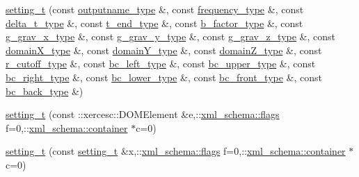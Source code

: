 \begin{DoxyCompactItemize}
\hyperlink{classsetting__t_a4e2de5576a4498b93491507ad7fbdcab}{setting\+\_\+t} (const \hyperlink{classsetting__t_a176d76dc9ab1b149c679035ce0aa5448}{outputname\+\_\+type} \&, const \hyperlink{classsetting__t_af0353930c8d9e0e19ee57943f2d130ee}{frequency\+\_\+type} \&, const \hyperlink{classsetting__t_ad2336c5ecdc0977272ba8126243d7977}{delta\+\_\+t\+\_\+type} \&, const \hyperlink{classsetting__t_ab27962fdbca01941c3b6c632bc7ac360}{t\+\_\+end\+\_\+type} \&, const \hyperlink{classsetting__t_afd5541e25ce3565005acb9c70bddda2d}{b\+\_\+factor\+\_\+type} \&, const \hyperlink{classsetting__t_af2a0b22be63f361de8ba6df7313b1a68}{g\+\_\+grav\+\_\+x\+\_\+type} \&, const \hyperlink{classsetting__t_a89b3c653de2dc5afa902042e34939589}{g\+\_\+grav\+\_\+y\+\_\+type} \&, const \hyperlink{classsetting__t_a2a9e06e642160debeeadb7a76b97c753}{g\+\_\+grav\+\_\+z\+\_\+type} \&, const \hyperlink{classsetting__t_a1bf57fd62042e86d0e1e66f34fbaed31}{domain\+X\+\_\+type} \&, const \hyperlink{classsetting__t_a9f13bfe9cc42660cf1e89cff4afe9435}{domain\+Y\+\_\+type} \&, const \hyperlink{classsetting__t_a2257367cc1475e2a9b1b2a82dbdaddaf}{domain\+Z\+\_\+type} \&, const \hyperlink{classsetting__t_ac5da16857addda387f3269e0a1a0cafa}{r\+\_\+cutoff\+\_\+type} \&, const \hyperlink{classsetting__t_a182532ef9d6146add054e0118af040f2}{bc\+\_\+left\+\_\+type} \&, const \hyperlink{classsetting__t_abf5df957f10853c7b6a54a0073cd61fa}{bc\+\_\+upper\+\_\+type} \&, const \hyperlink{classsetting__t_a958fcc958aca728509db3a1f3756a0c9}{bc\+\_\+right\+\_\+type} \&, const \hyperlink{classsetting__t_a69864ad49075236ce00f2a73cdcbb13b}{bc\+\_\+lower\+\_\+type} \&, const \hyperlink{classsetting__t_a6010c9a9fc3ce2a4d583aa4bf07f650c}{bc\+\_\+front\+\_\+type} \&, const \hyperlink{classsetting__t_a5deb32969da7832b53abbf0564142627}{bc\+\_\+back\+\_\+type} \&)
\item 
\hyperlink{classsetting__t_a5cfd2f330df2fe9f6f9150d4d17fc0ae}{setting\+\_\+t} (const \+::xercesc\+::\+D\+O\+M\+Element \&e,\+::\hyperlink{namespacexml__schema_a0612287d030cb2732d31a45b258fdc87}{xml\+\_\+schema\+::flags} f=0,\+::\hyperlink{namespacexml__schema_ada9aa30dc722e93ee2ed7243085402a5}{xml\+\_\+schema\+::container} $\ast$c=0)
\item 
\hyperlink{classsetting__t_a46ca32a962d225790096a0e1704b8d75}{setting\+\_\+t} (const \hyperlink{classsetting__t}{setting\+\_\+t} \&x,\+::\hyperlink{namespacexml__schema_a0612287d030cb2732d31a45b258fdc87}{xml\+\_\+schema\+::flags} f=0,\+::\hyperlink{namespacexml__schema_ada9aa30dc722e93ee2ed7243085402a5}{xml\+\_\+schema\+::container} $\ast$c=0)
\item 

\end{DoxyCompactItemize}
